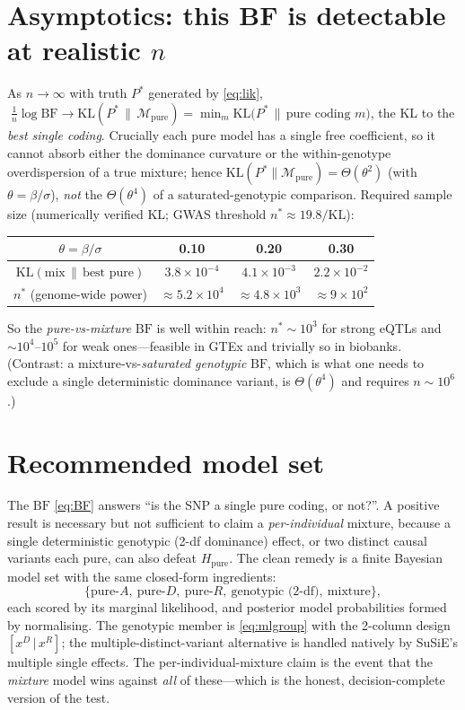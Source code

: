 \documentclass[11pt]{article}
\newcommand{\KL}{\mathrm{KL}}
\newcommand{\BF}{\mathrm{BF}}
\begin{document}
\section{Asymptotics: this BF is detectable at realistic $n$}
As $n\to\infty$ with truth $P^\ast$ generated by \eqref{eq:lik},
$\;\tfrac1n\log\BF \to \KL(P^\ast\,\|\,\mathcal M_{\mathrm{pure}})
=\min_{m}\KL\!\big(P^\ast\,\|\,\text{pure coding }m\big)$,
the KL to the \emph{best single coding}. Crucially each pure model has a single
free coefficient, so it cannot absorb either the dominance curvature or the
within-genotype overdispersion of a true mixture; hence
$\KL(P^\ast\|\mathcal M_{\mathrm{pure}})=\Theta(\theta^2)$ (with $\theta=\beta/\sigma$),
\emph{not} the $\Theta(\theta^4)$ of a saturated-genotypic comparison. Required
sample size (numerically verified KL; GWAS threshold $n^\ast\approx 19.8/\KL$):
\begin{center}\small
\begin{tabular}{cccc}
\toprule
$\theta=\beta/\sigma$ & 0.10 & 0.20 & 0.30\\
\midrule
$\KL(\text{mix}\,\|\,\text{best pure})$ & $3.8\times10^{-4}$ & $4.1\times10^{-3}$ & $2.2\times10^{-2}$\\
$n^\ast$ (genome-wide power) & $\approx 5.2\times10^{4}$ & $\approx 4.8\times10^{3}$ & $\approx 9\times10^{2}$\\
\bottomrule
\end{tabular}
\end{center}
So the \emph{pure-vs-mixture} $\BF$ is well within reach: $n^\ast\sim10^3$ for
strong eQTLs and $\sim10^4$--$10^5$ for weak ones---feasible in GTEx and trivially
so in biobanks. (Contrast: a mixture-vs-\emph{saturated genotypic} $\BF$, which is
what one needs to exclude a single deterministic dominance variant, is
$\Theta(\theta^4)$ and requires $n\sim10^6$.)

\section{Recommended model set}
The $\BF$ \eqref{eq:BF} answers ``is the SNP a single pure coding, or not?''.
A positive result is necessary but not sufficient to claim a \emph{per-individual}
mixture, because a single deterministic genotypic (2-df dominance) effect, or two
distinct causal variants each pure, can also defeat $H_{\mathrm{pure}}$. The clean
remedy is a finite Bayesian model set with the same closed-form ingredients:
\[
\{\text{pure-}A,\ \text{pure-}D,\ \text{pure-}R,\ \text{genotypic (2-df)},\ \text{mixture}\},
\]
each scored by its marginal likelihood, and posterior model probabilities formed
by normalising. The genotypic member is \eqref{eq:mlgroup} with the 2-column
design $[x^D\,|\,x^R]$; the multiple-distinct-variant alternative is handled
natively by SuSiE's multiple single effects. The per-individual-mixture claim is
the event that the \emph{mixture} model wins against \emph{all} of these---which is
the honest, decision-complete version of the test.
\end{document}
